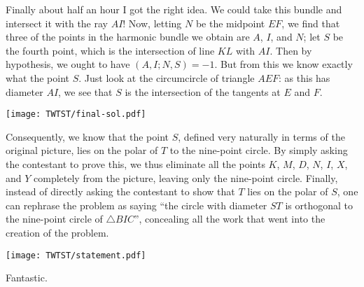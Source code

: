 \documentclass[11pt]{scrartcl}
\begin{document}
Finally about half an hour I got the right idea.
We could take this bundle and intersect it with the ray $AI$!
Now, letting $N$ be the midpoint $EF$,
we find that three of the points in the harmonic bundle we obtain
are $A$, $I$, and $N$; let $S$ be the fourth point,
which is the intersection of line $KL$ with $AI$.
Then by hypothesis, we ought to have $(A,I;N,S) = -1$.
But from this we know exactly what the point $S$.
Just look at the circumcircle of triangle $AEF$:
as this has diameter $AI$, we see that $S$
is the intersection of the tangents at $E$ and $F$.
\begin{center}
  \texttt{[image: TWTST/final-sol.pdf]}
\end{center}
Consequently, we know that the point $S$,
defined very naturally in terms of the original picture,
lies on the polar of $T$ to the nine-point circle.
By simply asking the contestant to prove this,
we thus eliminate all the points $K$, $M$, $D$, $N$, $I$, $X$, and $Y$
completely from the picture, leaving only the nine-point circle.
Finally, instead of directly asking the contestant to show
that $T$ lies on the polar of $S$, one can rephrase the problem as saying
``the circle with diameter $ST$ is orthogonal to the
nine-point circle of $\triangle BIC$'', concealing all the work
that went into the creation of the problem.
\begin{center}
  \texttt{[image: TWTST/statement.pdf]}
\end{center}
Fantastic.
\end{document}
